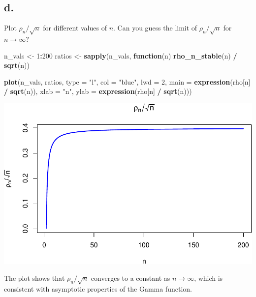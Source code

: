 \documentclass[
]{article}
\newenvironment{Shaded}{\begin{snugshade}}{\end{snugshade}}
\newcommand{\AttributeTok}[1]{\textcolor[rgb]{0.13,0.29,0.53}{#1}}
\newcommand{\ControlFlowTok}[1]{\textcolor[rgb]{0.13,0.29,0.53}{\textbf{#1}}}
\newcommand{\DecValTok}[1]{\textcolor[rgb]{0.00,0.00,0.81}{#1}}
\newcommand{\FunctionTok}[1]{\textcolor[rgb]{0.13,0.29,0.53}{\textbf{#1}}}
\newcommand{\NormalTok}[1]{#1}
\newcommand{\OtherTok}[1]{\textcolor[rgb]{0.56,0.35,0.01}{#1}}
\newcommand{\SpecialCharTok}[1]{\textcolor[rgb]{0.81,0.36,0.00}{\textbf{#1}}}
\newcommand{\StringTok}[1]{\textcolor[rgb]{0.31,0.60,0.02}{#1}}
\begin{document}
\subsection{d.~}\label{d.}

Plot \(\rho_n/\sqrt{n}\) for different values of \(n\). Can you guess
the limit of \(\rho_n/\sqrt{n}\) for \(n \rightarrow\infty\)?

\begin{Shaded}
\begin{Highlighting}[]
\NormalTok{n\_vals }\OtherTok{\textless{}{-}} \DecValTok{1}\SpecialCharTok{:}\DecValTok{200}
\NormalTok{ratios }\OtherTok{\textless{}{-}} \FunctionTok{sapply}\NormalTok{(n\_vals, }\ControlFlowTok{function}\NormalTok{(n) }\FunctionTok{rho\_n\_stable}\NormalTok{(n) }\SpecialCharTok{/} \FunctionTok{sqrt}\NormalTok{(n))}

\FunctionTok{plot}\NormalTok{(n\_vals, ratios, }\AttributeTok{type =} \StringTok{"l"}\NormalTok{, }\AttributeTok{col =} \StringTok{"blue"}\NormalTok{, }\AttributeTok{lwd =} \DecValTok{2}\NormalTok{,}
     \AttributeTok{main =} \FunctionTok{expression}\NormalTok{(rho[n] }\SpecialCharTok{/} \FunctionTok{sqrt}\NormalTok{(n)),}
     \AttributeTok{xlab =} \StringTok{"n"}\NormalTok{, }\AttributeTok{ylab =} \FunctionTok{expression}\NormalTok{(rho[n] }\SpecialCharTok{/} \FunctionTok{sqrt}\NormalTok{(n)))}
\end{Highlighting}
\end{Shaded}

\includegraphics{CS1_files/figure-latex/unnamed-chunk-9-1.pdf}

The plot shows that \(\rho_n / \sqrt{n}\) converges to a constant as
\(n \to \infty\), which is consistent with asymptotic properties of the
Gamma function.
\end{document}
